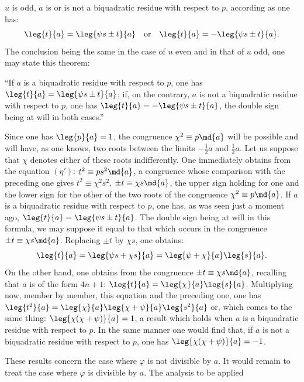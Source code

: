 \noindent
$u$ is odd, $a$ is or is not a biquadratic residue with respect to $p$, according
as one has:
\[
\leg{t}{a}=\leg{\psi s\pm t}{a}\quad\text{or}\quad
\leg{t}{a}=-\leg{\psi s\pm t}{a}.
\]
The conclusion being the same in the case of $u$ even and in that of $u$ odd,
one may state this theorem:
\par\indent
“If $a$ is a biquadratic residue with respect to $p$, one has $\leg{t}{a}=\leg{\psi s\pm t}{a}$;
if, on the contrary, $a$ is not a biquadratic residue with respect to $p$, one has
$\leg{t}{a}=-\leg{\psi s\pm t}{a}$, the double sign being at will in both cases.”
\par\indent
Since one has $\leg{p}{a}=1$, the congruence $\chi^2\equiv p\md{a}$ will be possible and
will have, as one knows, two roots between the limits $-\frac12a$ and $\frac12a$. Let us suppose
that $\chi$ denotes either of these roots indifferently. One immediately obtains
from the equation $(\eta')$: $t^2\equiv ps^2\md{a}$, a congruence whose comparison
with the preceding one gives $t^2\equiv\chi^2s^2$, $\pm t\equiv\chi s\md{a}$, the upper sign holding
for one and the lower sign for the other of the two roots of the congruence
$\chi^2\equiv p\md{a}$. If $a$ is a biquadratic residue with respect to $p$, one
has, as was seen just a moment ago, $\leg{t}{a}=\leg{\psi s\pm t}{a}$. The double sign
being at will in this formula, we may suppose it equal to that which
occurs in the congruence $\pm t\equiv\chi s\md{a}$. Replacing $\pm t$ by
$\chi s$, one obtains:
\[
\leg{t}{a}=\leg{\psi s+\chi s}{a}=\leg{\psi+\chi}{a}\leg{s}{a}.
\]
On the other hand, one obtains from the congruence $\pm t\equiv\chi s\md{a}$, recalling
that $a$ is of the form $4n+1$: $\leg{t}{a}=\leg{\chi}{a}\leg{s}{a}$. Multiplying now,
member by member, this equation and the preceding one, one has $\leg{t^2}{a}=\leg{\chi}{a}\leg{\chi+\psi}{a}\leg{s^2}{a}$
or, which comes to the same thing: $\leg{\chi(\chi+\psi)}{a}=1$, a result which holds when $a$ is
a biquadratic residue with respect to $p$. In the same manner one would find
that, if $a$ is not a biquadratic residue with respect to $p$, one has $\leg{\chi(\chi+\psi)}{a}=-1$.
\par\indent
These results concern the case where $\varphi$ is not divisible by $a$. It would remain
to treat the case where $\varphi$ is divisible by $a$. The analysis to be applied
